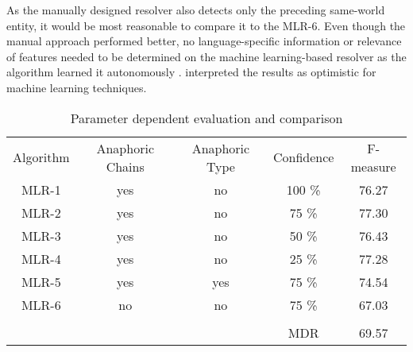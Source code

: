 As the manually designed resolver also detects only the preceding same-world entity, it would be most reasonable to compare it to the MLR-6. Even though the manual approach performed better, no language-specific information or relevance of features needed to be determined on the machine learning-based resolver as the algorithm learned it autonomously \citep{aone1995evaluating}. \cite{aone1995evaluating} interpreted the results as optimistic for machine learning techniques.


\begin{table}[h]
  \caption{Parameter dependent evaluation and comparison}
\begin{tabular}{|c|c|c|c|c|}
	\cline{1-5}
	Algorithm & Anaphoric Chains & Anaphoric Type& Confidence & F-measure \\ \cline{1-5}
	\cline{1-5}
	MLR-1 & yes & no & 100 \% &  76.27 \\ \cline{1-5}
	MLR-2 & yes & no & 75 \% & 77.30 \\ \cline{1-5}
	MLR-3 & yes & no & 50 \% & 76.43 \\ \cline{1-5}
	MLR-4 & yes & no & 25 \% & 77.28 \\ \cline{1-5}
	MLR-5 & yes & yes & 75 \% & 74.54 \\ \cline{1-5}
	MLR-6 & no & no & 75 \% & 67.03 \\ \cline{1-5}
	\multicolumn{5}{r}{}\\ \cline{4-5}
	\multicolumn{2}{r}{} & &  MDR & 69.57 \\
\cline{4-5}
	\end{tabular}

     \label{table:aone1995evals}
\end{table}


